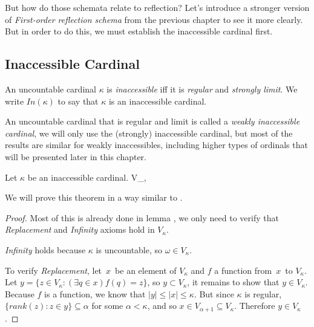 But how do those schemata relate to reflection? 
Let's introduce a stronger version of \emph{First-order reflection schema} from the previous chapter to see it more clearly. %
But in order to do this, we must establish the inaccessible cardinal first.

\subsection{Inaccessible Cardinal}\label{sec:inaccessible}
\begin{definition}
An uncountable cardinal $\kappa$ is \emph{inaccessible} iff it is \emph{regular} and \emph{strongly limit}. We write $In(\kappa)$ to say that $\kappa$ is an inaccessible cardinal.
\end{definition}

An uncountable cardinal that is regular and limit is called a \emph{weakly inaccessible cardinal}, we will only use the (strongly) inaccessible cardinal, but most of the results are similar for weakly inaccessibles, including higher types of ordinals that will be presented later in this chapter.

\begin{theorem}
Let $\kappa$ be an inaccessible cardinal.
\beq
\langle V_\kappa, \in \rangle~\models~
\eeq
\end{theorem}

We will prove this theorem in a way similar to \cite{KanamoriBook}.
\begin{proof}
Most of this is already done in lemma , we only need to verify that \emph{Replacement} and \emph{Infinity} axioms hold in $V_\kappa$.

\emph{Infinity} holds because $\kappa$ is uncountable, so $\omega \in V_\kappa$.

To verify \emph{Replacement}, let~$x$~be an element of $V_\kappa$ and $f$ a function from~$x$~to $V_\kappa$. Let $y = \{z \in V_\kappa : (\exists q \in x) f(q) = z \}$, so $y \subset V_\kappa$, it remains to show that $y \in V_\kappa$. Because $f$ is a function, we know that $|y| \leq |x| \leq \kappa$. But since $\kappa$ is regular, $\{rank(z) : z \in y\} \subseteq \alpha$ for some $\alpha < \kappa$, and so $x \in V_{\alpha+1} \subseteq V_\kappa$. Therefore $y \in V_\kappa$.
\end{proof}

